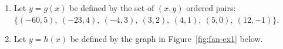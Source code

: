 \begin{myPractice}
	\begin{enumerate}
		\item Let $y=g(x)$ be defined by the set of $(x,y)$ ordered pairs:\\
		 $\{ (-60,5), ~ (-23,4), ~ (-4,3), ~ (3,2), ~ (4,1), ~ (5,0), ~ (12,-1)\}$.
			\begin{enumerate}[label=\roman*.]
			\end{enumerate}
		\vfill

		\item Let $y=h(x)$ be defined by the graph in Figure~\ref{fig:fan-ex1} below.
		

\end{enumerate}
\end{myPractice}
